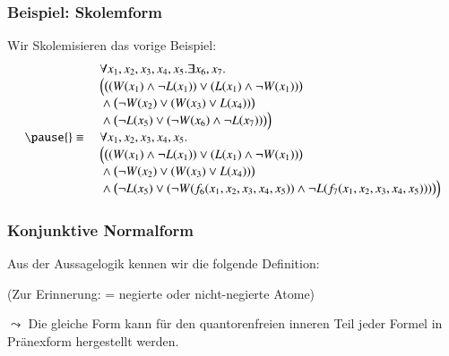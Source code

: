 \documentclass[onlymath]{beamer}
\begin{document}
\begin{frame}\frametitle{Beispiel: Skolemform}

Wir Skolemisieren das vorige Beispiel:
\[\begin{array}{rl}
& \forall x_1,x_2,x_3,x_4,x_5.\exists x_6,x_7.\\
& \Big(\big((W(x_1)\wedge\neg L(x_1))\vee (L(x_1)\wedge\neg W(x_1))\big)\\
& {}\wedge{}  \big(\neg W(x_2)\vee(W(x_3) \vee L(x_4))\big)\\
& {}\wedge{}  \big(\neg L(x_5)\vee(\neg W(x_6) \wedge \neg L(x_7))\big)\Big)\\\pause
{}\equiv{} & \forall x_1,x_2,x_3,x_4,x_5.\\
& \Big(\big((W(x_1)\wedge\neg L(x_1))\vee (L(x_1)\wedge\neg W(x_1))\big)\\
& {}\wedge{}  \big(\neg W(x_2)\vee(W(x_3) \vee L(x_4))\big)\\
& {}\wedge{}  \big(\neg L(x_5)\vee(\neg W(f_6(x_1,x_2,x_3,x_4,x_5)) \wedge \neg L(f_7(x_1,x_2,x_3,x_4,x_5)))\big)\Big)
\end{array}
\]


\end{frame}


\begin{frame}\frametitle{Konjunktive Normalform}

Aus der Aussagelogik kennen wir die folgende Definition:
\bigskip

\medskip

(Zur Erinnerung:  = negierte oder nicht-negierte Atome)
\bigskip

$\leadsto$ Die gleiche Form kann für den quantorenfreien inneren Teil jeder Formel in Pränexform hergestellt werden.

\end{frame}
\end{document}
